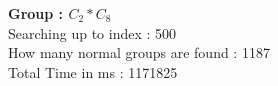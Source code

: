 \textbf{Group : $C_2*C_8$}\\
Searching up to index : 500\\
How many normal groups are found : 1187\\
Total Time in ms : 1171825\\
